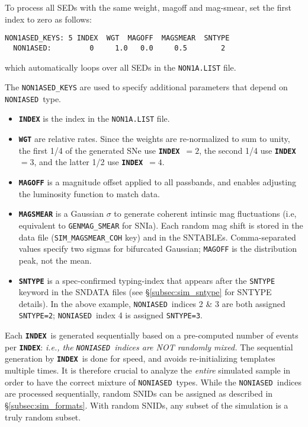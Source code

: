 \documentclass[12pt]{article}
\newcommand{\NONIA}{{\tt NONIASED}}
\newcommand{\indx}{{\bf\tt INDEX}}
\begin{document}
To process all SEDs with the same weight, magoff and mag-smear,
set the first index to zero as follows:
\begin{Verbatim}[frame=single]
  NON1ASED_KEYS: 5 INDEX  WGT  MAGOFF  MAGSMEAR  SNTYPE
  NON1ASED:         0     1.0   0.0     0.5        2
\end{Verbatim}
%
which automatically loops over all SEDs in the {\tt NON1A.LIST} file.

\clearpage
\medskip
The {\tt NON1ASED\_KEYS} are used to specify additional parameters 
that depend on \NONIA\ type. 
\begin{itemize}[noitemsep]
 \item {\tt\bf INDEX} is the index in the {\tt NON1A.LIST} file.
%
 \item {\tt\bf WGT} are relative rates.
   Since the weights are re-normalized to sum to unity,
   the first 1/4 of the generated SNe use \indx\ $=2$,
   the second 1/4 use \indx\ $=3$,
   and the latter 1/2 use \indx\ $=4$.
%
  \item {\tt\bf MAGOFF} is a magnitude offset applied to all passbands, 
      and enables adjusting the luminosity function to match data.    
%
   \item {\tt\bf MAGSMEAR} is a Gaussian $\sigma$ to generate coherent 
       intinsic mag fluctuations 
       (i.e, equivalent to {\tt GENMAG\_SMEAR} for SNIa).
       Each random mag shift is stored in the data file
       ({\tt SIM\_MAGSMEAR\_COH} key) and in the SNTABLEs.
       Comma-separated values specify two sigmas for bifurcated Gaussian;
       {\tt MAGOFF} is the distribution peak, not the mean.
%
  \item {\tt\bf SNTYPE} is a spec-confirmed typing-index that appears
       after the {\tt SNTYPE} keyword in the 
       SNDATA files (see \S\ref{subsec:sim_sntype} for SNTYPE details).
       In the above example, \NONIA\ indices 2 \& 3 are both 
       assigned {\tt SNTYPE=2};
       \NONIA\ index 4 is assigned  {\tt SNTYPE=3}.  
\end{itemize}


Each \indx\ is generated sequentially based on a pre-computed number
of events per \indx:
{\it i.e., the \NONIA\ indices are NOT randomly mixed.}
The sequential generation by \indx\ is done for speed,
and avoids re-initializing templates multiple times.
It is therefore crucial to analyze the {\it entire}
simulated sample in order to have the correct mixture
of \NONIA\ types.
While the \NONIA\ indices are processed sequentially,
random SNIDs can be assigned as described in   
\S\ref{subsec:sim_formats}. With random SNIDs,
any subset of the simulation is a truly random subset.
\end{document}
